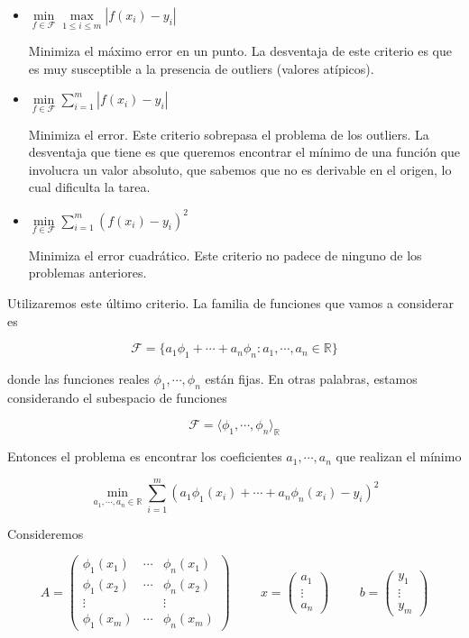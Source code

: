 \begin{itemize}
\item $\min\limits_{f \in \mathcal{F}}\max\limits_{1 \leq i \leq m} |f(x_i) - y_i|$

Minimiza el máximo error en un punto. La desventaja de este criterio es que es muy susceptible a la presencia de outliers (valores atípicos).

\item $\min\limits_{f \in \mathcal{F}} \sum_{i = 1}^m |f(x_i) - y_i|$

Minimiza el error. Este criterio sobrepasa el problema de los outliers. La desventaja que tiene es que queremos encontrar el mínimo de una función que involucra un valor absoluto, que sabemos que no es derivable en el origen, lo cual dificulta la tarea.

\item $\min\limits_{f \in \mathcal{F}} \sum_{i = 1}^m (f(x_i) - y_i)^2$

Minimiza el error cuadrático. Este criterio no padece de ninguno de los problemas anteriores.
\end{itemize}

Utilizaremos este último criterio. La familia de funciones que vamos a considerar es

\[\mathcal{F} = \{a_1 \phi_1 + \cdots + a_n \phi_n : a_1, \cdots, a_n \in \mathbb{R}\}\]

donde las funciones reales $\phi_1, \cdots, \phi_n$ están fijas. En otras palabras, estamos considerando el subespacio de funciones

\[\mathcal{F} = \langle\phi_1, \cdots, \phi_n\rangle_{\mathbb{R}}\]

Entonces el problema es encontrar los coeficientes $a_1, \cdots, a_n$ que realizan el mínimo

\[\min\limits_{a_1, \cdots, a_n \in \mathbb{R}} \sum_{i = 1}^m (a_1 \phi_1(x_i) + \cdots + a_n \phi_n(x_i) - y_i)^2\]

Consideremos

\[A = \begin{pmatrix}
\phi_1(x_1) & \cdots & \phi_n(x_1) \\
\phi_1(x_2) & \cdots & \phi_n(x_2) \\
\vdots		&		&	\vdots		\\
\phi_1(x_m)	& \cdots & \phi_n(x_m)
\end{pmatrix}
\hspace{1cm}
x = \begin{pmatrix}
a_1 \\
\vdots \\
a_n
\end{pmatrix}
\hspace{1cm}
b = \begin{pmatrix}
y_1\\
\vdots\\
y_m
\end{pmatrix}
\]

